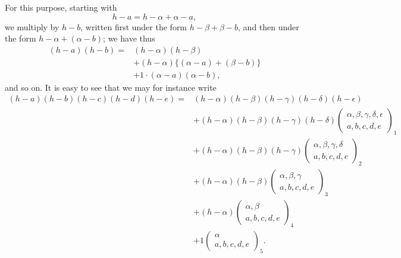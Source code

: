 \documentclass[11pt,a4paper]{article}
\theoremstyle{plain}
\theoremstyle{definition}
\begin{document}
For this purpose, starting with
\[
h-a=h-\alpha+\alpha-a,
\]
we multiply by $h-b$, written first under the form $h-\beta+\beta-b$, and then under the
form $h-\alpha+(\alpha-b)$; we have thus
\[
\begin{aligned}
(h-a)(h-b)={}&(h-\alpha)(h-\beta)\\
&+(h-\alpha)\{(\alpha-a)+(\beta-b)\}\\
&+1\cdot(\alpha-a)(\alpha-b),
\end{aligned}
\]
and so on. It is easy to see that we may for instance write
\[
\begin{aligned}
(h-a)(h-b)(h-c)(h-d)(h-e)
={}&(h-\alpha)(h-\beta)(h-\gamma)(h-\delta)(h-\epsilon)\\
&+(h-\alpha)(h-\beta)(h-\gamma)(h-\delta)
\left(\begin{array}{c}
\alpha,\beta,\gamma,\delta,\epsilon\\
a,b,c,d,e
\end{array}\right)_1\\
&+(h-\alpha)(h-\beta)(h-\gamma)
\left(\begin{array}{c}
\alpha,\beta,\gamma,\delta\\
a,b,c,d,e
\end{array}\right)_2\\
&+(h-\alpha)(h-\beta)
\left(\begin{array}{c}
\alpha,\beta,\gamma\\
a,b,c,d,e
\end{array}\right)_3\\
&+(h-\alpha)
\left(\begin{array}{c}
\alpha,\beta\\
a,b,c,d,e
\end{array}\right)_4\\
&+1\left(\begin{array}{c}
\alpha\\
a,b,c,d,e
\end{array}\right)_5 .
\end{aligned}
\]

\clearpage
\end{document}
